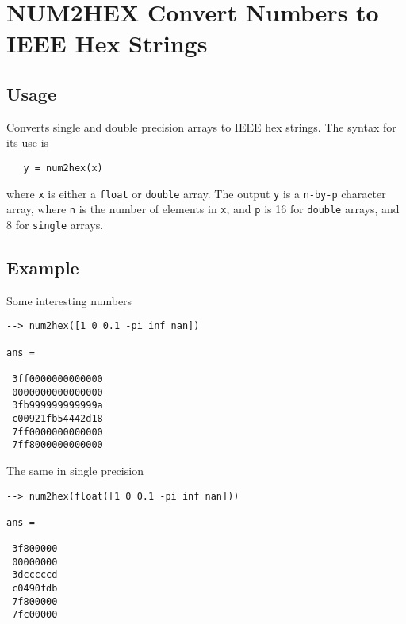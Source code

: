 \section{NUM2HEX Convert Numbers to IEEE Hex Strings}

\subsection{Usage}

Converts single and double precision arrays to IEEE hex strings.  The
syntax for its use is
\begin{verbatim}
   y = num2hex(x)
\end{verbatim}
where \verb|x| is either a \verb|float| or \verb|double| array.  The output \verb|y| is
a \verb|n-by-p| character array, where \verb|n| is the number of elements in \verb|x|,
and \verb|p| is 16 for \verb|double| arrays, and 8 for \verb|single| arrays.
\subsection{Example}

Some interesting numbers
\begin{verbatim}
--> num2hex([1 0 0.1 -pi inf nan])

ans = 

 3ff0000000000000
 0000000000000000
 3fb999999999999a
 c00921fb54442d18
 7ff0000000000000
 7ff8000000000000
\end{verbatim}
The same in single precision
\begin{verbatim}
--> num2hex(float([1 0 0.1 -pi inf nan]))

ans = 

 3f800000
 00000000
 3dcccccd
 c0490fdb
 7f800000
 7fc00000
\end{verbatim}
